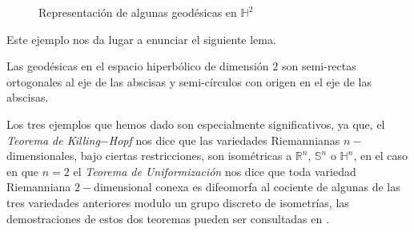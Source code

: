 \begin{figure}[h]
	\centering
	
  \caption{Representación de algunas geodésicas en $\mathbb{H}^{2}$}
\end{figure}

Este ejemplo nos da lugar a enunciar el siguiente lema.

\begin{lemma}
  Las geodésicas en el espacio hiperbólico de dimensión $2$ son semi-rectas ortogonales al eje de las abscisas y semi-círculos con origen en el eje de las abscisas.
\end{lemma}

Los tres ejemplos que hemos dado son especialmente significativos, ya que, el \textit{Teorema de Killing$-$Hopf} nos dice que las variedades Riemannianas $n-$dimensionales, bajo ciertas restricciones, son isométricas a $\mathbb{R}^{n}$, $\mathbb{S}^{n}$ o $\mathbb{H}^{n}$, en el caso en que $n=2$ el \textit{Teorema de Uniformización} nos dice que toda variedad Riemanniana $2-$dimensional conexa es difeomorfa al cociente de algunas de las tres variedades anteriores modulo un grupo discreto de isometrías, las demostraciones de estos dos teoremas pueden ser consultadas en \textcite{lee2019introduction}.
